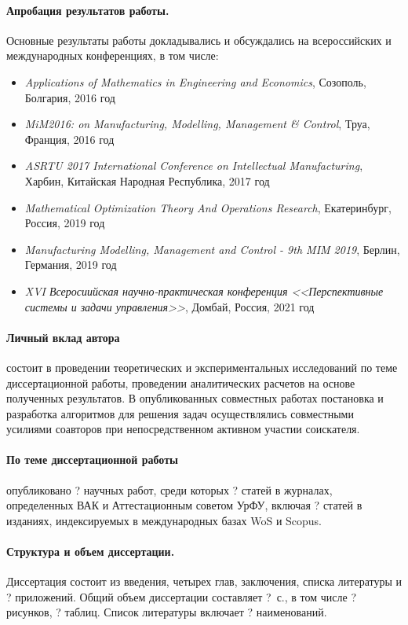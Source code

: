 \paragraph*{Апробация результатов работы.}
Основные результаты работы докладывались и обсуждались на всероссийских и международных конференциях, в том числе:

\begin{itemize}
    \item
    \textit{Applications of Mathematics in Engineering and Economics},
    Созополь, Болгария, 2016 год
    \item
    \textit{MiM2016: on Manufacturing, Modelling, Management \& Control},
    Труа, Франция, 2016 год
    \item
    \textit{ASRTU 2017 International Conference on Intellectual Manufacturing},
    Харбин, Китайская Народная Республика, 2017 год
    \item
    \textit{Mathematical Optimization Theory And Operations Research},
    Екатеринбург, Россия, 2019 год
    \item
    \textit{Manufacturing Modelling, Management and Control - 9th MIM 2019},
    Берлин, Германия, 2019 год
    \item
    \textit{XVI Всеросиийская научно-практическая конференция 
    <<Перспективные системы и задачи управления>>},
    Домбай, Россия, 2021 год
\end{itemize}

\paragraph*{Личный вклад автора}
состоит в проведении теоретических и экспериментальных исследований 
по теме диссертационной работы, 
проведении аналитических расчетов на основе полученных результатов.
В опубликованных совместных работах постановка и разработка алгоритмов для
решения задач осуществлялись совместными усилиями соавторов 
при непосредственном активном участии соискателя.

\paragraph*{По теме диссертационной работы}
опубликовано ? научных работ, 
среди которых ? статей в журналах, определенных ВАК и Аттестационным советом УрФУ, 
включая ? статей в изданиях, индексируемых в международных базах WoS и Scopus.

\paragraph*{Структура и объем диссертации.}
Диссертация состоит из введения, 
четырех глав, заключения, списка литературы и ? приложений. 
Общий объем диссертации составляет ?~с., 
в том числе ? рисунков, ? таблиц. 
Список литературы включает ? наименований.

